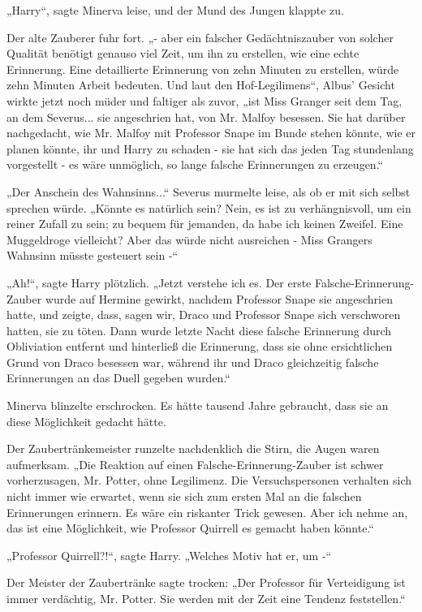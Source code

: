 {„Harry“, sagte Minerva leise, und der Mund des Jungen klappte zu.

Der alte Zauberer fuhr fort. „- aber ein falscher Gedächtniszauber von solcher Qualität benötigt genauso viel Zeit, um ihn zu erstellen, wie eine echte Erinnerung. Eine detaillierte Erinnerung von zehn Minuten zu erstellen, würde zehn Minuten Arbeit bedeuten. Und laut den Hof-Legilimens“, Albus' Gesicht wirkte jetzt noch müder und faltiger als zuvor, „ist Miss Granger seit dem Tag, an dem Severus... sie angeschrien hat, von Mr. Malfoy besessen. Sie hat darüber nachgedacht, wie Mr. Malfoy mit Professor Snape im Bunde stehen könnte, wie er planen könnte, ihr und Harry zu schaden - sie hat sich das jeden Tag stundenlang vorgestellt - es wäre unmöglich, so lange falsche Erinnerungen zu erzeugen.“

„Der Anschein des Wahnsinns...“ Severus murmelte leise, als ob er mit sich selbst sprechen würde. „Könnte es natürlich sein? Nein, es ist zu verhängnisvoll, um ein reiner Zufall zu sein; zu bequem für jemanden, da habe ich keinen Zweifel. Eine Muggeldroge vielleicht? Aber das würde nicht ausreichen - Miss Grangers Wahnsinn müsste gesteuert sein -“

„Ah!“, sagte Harry plötzlich. „Jetzt verstehe ich es. Der erste Falsche-Erinnerung-Zauber wurde auf Hermine gewirkt, nachdem Professor Snape sie angeschrien hatte, und zeigte, dass, sagen wir, Draco und Professor Snape sich verschworen hatten, sie zu töten. Dann wurde letzte Nacht diese falsche Erinnerung durch Obliviation entfernt und hinterließ die Erinnerung, dass sie ohne ersichtlichen Grund von Draco besessen war, während ihr und Draco gleichzeitig falsche Erinnerungen an das Duell gegeben wurden.“

Minerva blinzelte erschrocken. Es hätte tausend Jahre gebraucht, dass sie an diese Möglichkeit gedacht hätte.

Der Zaubertränkemeister runzelte nachdenklich die Stirn, die Augen waren aufmerksam. „Die Reaktion auf einen Falsche-Erinnerung-Zauber ist schwer vorherzusagen, Mr. Potter, ohne Legilimenz. Die Versuchspersonen verhalten sich nicht immer wie erwartet, wenn sie sich zum ersten Mal an die falschen Erinnerungen erinnern. Es wäre ein riskanter Trick gewesen. Aber ich nehme an, das ist eine Möglichkeit, wie Professor Quirrell es gemacht haben könnte.“

„Professor Quirrell?!“, sagte Harry. „Welches Motiv hat er, um -“

Der Meister der Zaubertränke sagte trocken: „Der Professor für Verteidigung ist immer verdächtig, Mr. Potter. Sie werden mit der Zeit eine Tendenz feststellen.“

}
